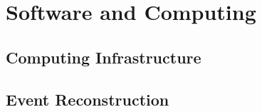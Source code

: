 \chapter{Software and Computing}
\label{ch:detectors-sc}

\section{Computing Infrastructure}
\label{sec:detectors-sc-infrastructure}

\section{Event Reconstruction}
\label{sec:detectors-sc-reco}


